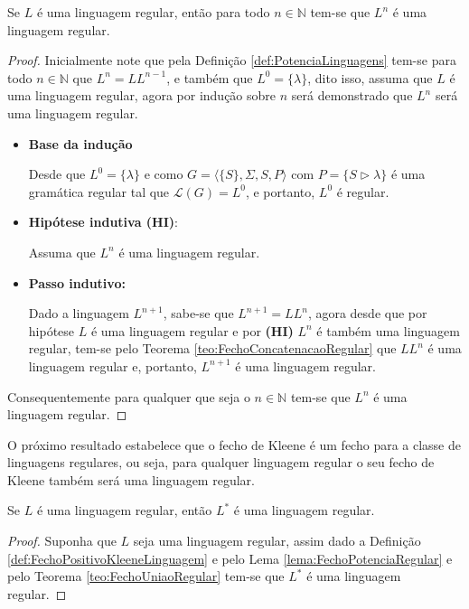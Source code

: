 \begin{lemma}\label{lema:FechoPotenciaRegular}
	Se $L$ é uma linguagem regular, então para todo $n \in \mathbb{N}$ tem-se que $L^n$ é uma linguagem regular.
\end{lemma}

\begin{proof}
	Inicialmente note que pela Definição \ref{def:PotenciaLinguagens} tem-se para todo $n \in \mathbb{N}$ que $L^n = LL^{n-1}$, e também que $L^0 = \{\lambda\}$, dito isso, assuma que $L$ é uma linguagem regular, agora por indução sobre $n$ será demonstrado que $L^n $ será uma linguagem regular.
	
	\begin{itemize}
		\item \textbf{Base da indução}
		
		Desde que $L^0 = \{\lambda\}$ e como $G = \langle \{S\}, \Sigma, S, P\rangle$ com $P = \{S \rhd \lambda \}$ é uma gramática regular tal que $\mathcal{L}(G) =L^0$, e portanto,  $L^0$ é regular.
		
		\item \textbf{Hipótese indutiva (HI)}: 
		
		Assuma que $L^n$ é uma linguagem regular.
		
		\item \textbf{Passo indutivo:}
		
		Dado a linguagem $L^{n+1}$, sabe-se que $L^{n+1} = LL^{n}$, agora desde que por hipótese $L$ é uma linguagem regular e por \textbf{(HI)} $L^n$ é também uma linguagem regular, tem-se pelo Teorema \ref{teo:FechoConcatenacaoRegular} que $LL^{n}$ é uma linguagem regular e, portanto, $L^{n+1}$ é uma linguagem regular.
	\end{itemize}
	Consequentemente para qualquer que seja o $n \in \mathbb{N}$ tem-se que $L^n$ é uma linguagem regular.
\end{proof}

O próximo resultado estabelece que o fecho de Kleene é um fecho para a classe de linguagens regulares, ou seja, para qualquer linguagem regular o seu fecho de Kleene também será uma linguagem regular.

\begin{theorem}
	Se $L$ é uma linguagem regular, então $L^*$ é uma linguagem regular.
\end{theorem}

\begin{proof}
	Suponha que $L$ seja uma linguagem regular, assim dado a Definição \ref{def:FechoPositivoKleeneLinguagem} e pelo Lema \ref{lema:FechoPotenciaRegular} e pelo Teorema \ref{teo:FechoUniaoRegular} tem-se que $L^*$ é uma linguagem regular.
\end{proof}


